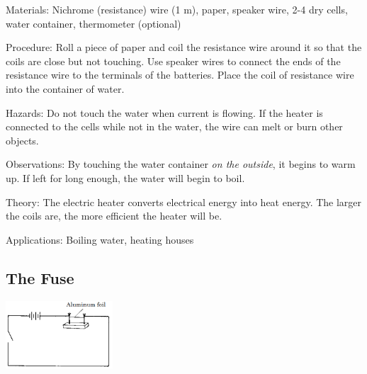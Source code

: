 \begin{multicols}{2}
\begin{description*}
\item[Materials:]{Nichrome (resistance) wire (1 m), paper, speaker wire, 2-4 dry cells, water container, thermometer (optional)}
\item[Procedure:]{Roll a piece of paper and coil the resistance wire around it so that the coils are close but not touching. Use speaker wires to connect the ends of the resistance wire to the terminals of the batteries. Place the coil of resistance wire into the container of water.}
\item[Hazards:]{Do not touch the water when current is flowing. If the heater is connected to the cells while not in the water, the wire can melt or burn other objects.}
\item[Observations:]{By touching the water container \emph{on the outside}, it begins to warm up. If left for long enough, the water will begin to boil.}
\item[Theory:]{The electric heater converts electrical energy into heat energy. The larger the coils are, the more efficient the heater will be.}
\item[Applications:]{Boiling water, heating houses}
\end{description*}

\subsection{The Fuse}

\begin{center}
\includegraphics[width=0.3\textwidth]{./img/source/fuse.png}
\end{center}


\end{multicols}

